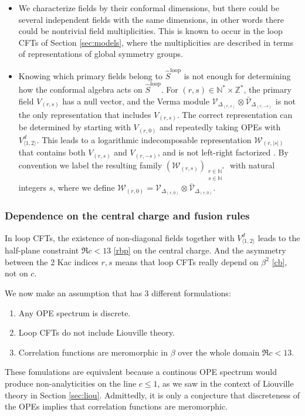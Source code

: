 \documentclass[12pt, a4paper]{article}
\begin{document}
\begin{itemize}
 \item We characterize fields by their conformal dimensions, but there could be several independent fields with the same dimensions, in other words there could be nontrivial field multiplicities. This is known to occur in the loop CFTs of Section \ref{sec:models}, where the multiplicities are described in terms of representations of global symmetry groups.  
 \item Knowing which primary fields belong to $\widehat{S}^\text{loop}$ is not enough for determining how the conformal algebra acts on $\widehat{S}^\text{loop}$. For $(r,s)\in \mathbb{N}^*\times \mathbb{Z}^*$, the primary field $V_{(r,s)}$ has a null vector, and the Verma module $\mathcal{V}_{\Delta_{(r,s)}}\otimes\bar{\mathcal{V}}_{\Delta_{(r,-s)}}$ is not the only representation that includes $V_{(r,s)}$. The correct representation can be determined by starting with $V_{(r,0)}$ and repeatedly taking OPEs with $V^d_{\langle 1,2\rangle}$. This leads to a logarithmic indecomposable representation $\mathcal{W}_{(r,|s|)}$ that contains both $V_{(r,s)}$ and $V_{(r,-s)}$, and is not left-right factorized \cite{nr20}. By convention we label the resulting family $\left(\mathcal{W}_{(r,s)}\right)_{\substack{r\in \mathbb{N}^*\\ s\in\mathbb{N}}}$ with natural integers $s$, where we define 
 $\mathcal{W}_{(r,0)}= \mathcal{V}_{\Delta_{(r,0)}}\otimes\bar{\mathcal{V}}_{\Delta_{(r,0)}}$.
\end{itemize}

\subsubsection{Dependence on the central charge and fusion rules}

In loop CFTs, the existence of non-diagonal fields together with $V^d_{\langle 1,2\rangle}$ leads to the half-plane constraint $\Re c<13$ \eqref{rbp} on the central charge. And the asymmetry between the 2 Kac indices $r,s$ means that loop CFTs really depend on $\beta^2$ \eqref{cb}, not on $c$. 

We now make an assumption that has 3 different formulations:
\begin{enumerate}
 \item Any OPE spectrum is discrete.
 \item Loop CFTs do not include Liouville theory. 
 \item Correlation functions are meromorphic in $\beta$ over the whole domain $\Re c<13$.
\end{enumerate}
These fomulations are equivalent because a continous OPE spectrum would produce non-analyticities on the line $c\leq 1$, as we saw in the context of Liouville theory in Section \ref{sec:liou}. Admittedly, it is only a conjecture that discreteness of the OPEs implies that correlation functions are meromorphic.
\end{document}
